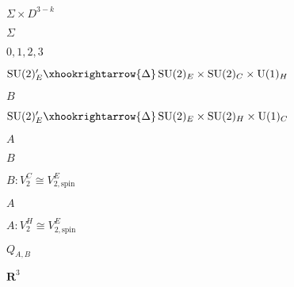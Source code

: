 \begin{preview}
\setcounter{equation}{0}%
\( \Sigma \times D^{3-k} \)
\end{preview}

\begin{preview}
\setcounter{equation}{0}%
\( \Sigma \)
\end{preview}

\begin{preview}
\setcounter{equation}{0}%
\(0, 1,2,3 \)
\end{preview}

\begin{preview}
\setcounter{equation}{0}%
\( \operatorname{SU}(2)'_E \xhookrightarrow{\Delta} \operatorname{SU}(2)_E \times  \operatorname{SU}(2)_{C} \times \operatorname{U}(1)_{H} \)
\end{preview}

\begin{preview}
\setcounter{equation}{0}%
\( B \)
\end{preview}

\begin{preview}
\setcounter{equation}{0}%
\( \operatorname{SU}(2)'_E\xhookrightarrow{\Delta} \operatorname{SU}(2)_E \times \operatorname{SU}(2)_H \times \operatorname{U}(1)_{C} \)
\end{preview}

\begin{preview}
\setcounter{equation}{0}%
\( A \)
\end{preview}

\begin{preview}
\setcounter{equation}{0}%
\( B \)
\end{preview}

\begin{preview}
\setcounter{equation}{0}%
\( B: V_2^C \cong V_{2, \mathrm{spin}}^E \)
\end{preview}

\begin{preview}
\setcounter{equation}{0}%
\( A \)
\end{preview}

\begin{preview}
\setcounter{equation}{0}%
\( A : V_2^H \cong V_{2,\mathrm{spin}}^E \)
\end{preview}

\begin{preview}
\setcounter{equation}{0}%
\( Q_{A,B} \)
\end{preview}

\begin{preview}
\setcounter{equation}{0}%
\( \mathbf{R}^3 \)
\end{preview}


